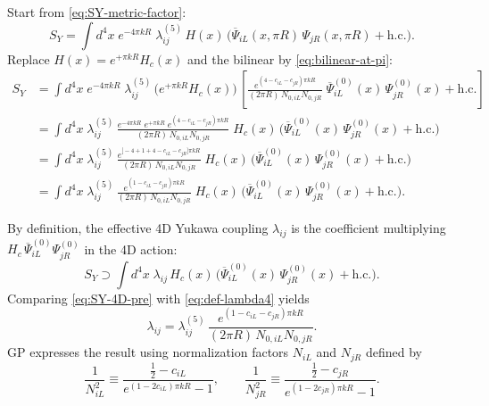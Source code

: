 \documentclass[11pt]{article}
\begin{document}
Start from \eqref{eq:SY-metric-factor}:
\[
S_Y
=
\int d^4x\;
e^{-4\pi kR}\;
\lambda^{(5)}_{ij}\,H(x)\,
\Big(\overline{\Psi}_{iL}(x,\pi R)\,\Psi_{jR}(x,\pi R)+\text{h.c.}\Big).
\]
Replace $H(x)=e^{+\pi kR}H_c(x)$ and the bilinear by \eqref{eq:bilinear-at-pi}:
\begin{align}
S_Y
&=
\int d^4x\;
e^{-4\pi kR}\;
\lambda^{(5)}_{ij}\,
\big(e^{+\pi kR}H_c(x)\big)\,
\left[
\frac{e^{(4-c_{iL}-c_{jR})\pi kR}}{(2\pi R)\,N_{0,iL}N_{0,jR}}\;
\overline{\Psi}^{(0)}_{iL}(x)\,\Psi^{(0)}_{jR}(x)
+\text{h.c.}
\right]
\nonumber\\[6pt]
&=
\int d^4x\;
\lambda^{(5)}_{ij}\,
\frac{e^{-4\pi kR}\;e^{+\pi kR}\;e^{(4-c_{iL}-c_{jR})\pi kR}}{(2\pi R)\,N_{0,iL}N_{0,jR}}\;
H_c(x)\,
\Big(\overline{\Psi}^{(0)}_{iL}(x)\,\Psi^{(0)}_{jR}(x)+\text{h.c.}\Big)
\nonumber\\[6pt]
&=
\int d^4x\;
\lambda^{(5)}_{ij}\,
\frac{e^{\big[-4+1+4-c_{iL}-c_{jR}\big]\pi kR}}{(2\pi R)\,N_{0,iL}N_{0,jR}}\;
H_c(x)\,
\Big(\overline{\Psi}^{(0)}_{iL}(x)\,\Psi^{(0)}_{jR}(x)+\text{h.c.}\Big)
\nonumber\\[6pt]
&=
\int d^4x\;
\lambda^{(5)}_{ij}\,
\frac{e^{(1-c_{iL}-c_{jR})\pi kR}}{(2\pi R)\,N_{0,iL}N_{0,jR}}\;
H_c(x)\,
\Big(\overline{\Psi}^{(0)}_{iL}(x)\,\Psi^{(0)}_{jR}(x)+\text{h.c.}\Big).
\label{eq:SY-4D-pre}
\end{align}

By definition, the effective 4D Yukawa coupling $\lambda_{ij}$ is the coefficient multiplying
$H_c\,\overline{\Psi}^{(0)}_{iL}\Psi^{(0)}_{jR}$ in the 4D action:
\begin{equation}
S_Y \supset \int d^4x\;
\lambda_{ij}\,H_c(x)\,
\Big(\overline{\Psi}^{(0)}_{iL}(x)\,\Psi^{(0)}_{jR}(x)+\text{h.c.}\Big).
\label{eq:def-lambda4}
\end{equation}
Comparing \eqref{eq:SY-4D-pre} with \eqref{eq:def-lambda4} yields
\begin{equation}
\lambda_{ij}
=
\lambda^{(5)}_{ij}\,
\frac{e^{(1-c_{iL}-c_{jR})\pi kR}}{(2\pi R)\,N_{0,iL}N_{0,jR}}.
\label{eq:lambda4-with-N0}
\end{equation}
GP expresses the result using normalization factors $N_{iL}$ and $N_{jR}$ defined by
\begin{equation}
\frac{1}{N_{iL}^2}
\equiv
\frac{\frac12-c_{iL}}{e^{(1-2c_{iL})\pi kR}-1},
\qquad
\frac{1}{N_{jR}^2}
\equiv
\frac{\frac12-c_{jR}}{e^{(1-2c_{jR})\pi kR}-1}.
\label{eq:Npaper-def}
\end{equation}
\end{document}
